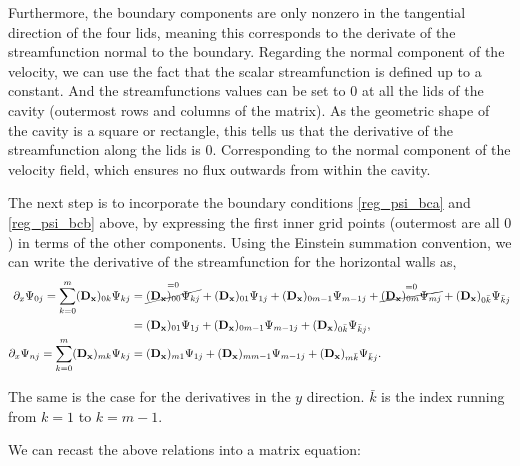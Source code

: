 Furthermore, the boundary components are only nonzero in the tangential
direction of the four lids, meaning this corresponds to the derivate of the
streamfunction normal to the boundary. Regarding the normal component of the
velocity, we can use the fact that the scalar streamfunction is defined up to a
constant. And the streamfunctions values can be set to $0$ at all the lids of
the cavity (outermost rows and columns of the matrix). As the geometric shape
of the cavity is a square or rectangle, this tells us that the derivative of
the streamfunction along the lids is $0$. Corresponding to the normal component
of the velocity field, which ensures no flux outwards from within the cavity.

The next step is to incorporate the boundary conditions \eqref{reg_psi_bca} and
\eqref{reg_psi_bcb} above, by expressing the first inner grid points (outermost
are all $0$) in terms of the other components. Using the Einstein summation
convention, we can write the derivative of the streamfunction for the
horizontal walls as,
\begin{align}
\partial_x \Psi_{0j} = \sum_{k=0}^{m} (\mathbf{D_x})_{0k} \Psi_{kj}
  &= \overset{=0}{\cancel{(\mathbf{D_x})_{00}\Psi_{kj}}} + (\mathbf{D_x})_{01}\Psi_{1j} 
  + (\mathbf{D_x})_{0m-1}\Psi_{m-1j} +  \overset{=0}{\cancel{(\mathbf{D_x})_{0m}\Psi_{mj}}}
  + (\mathbf{D_x})_{0\bar{k}}\Psi_{\bar{k}j} \nonumber \\
  &= (\mathbf{D_x})_{01}\Psi_{1j} + (\mathbf{D_x})_{0m-1}\Psi_{m-1j}
  + (\mathbf{D_x})_{0\bar{k}}\Psi_{\bar{k}j}, \\
\partial_x \Psi_{nj} = \sum_{k=0}^{m} (\mathbf{D_x})_{mk} \Psi_{kj}
  &= (\mathbf{D_x})_{m1}\Psi_{1j} + (\mathbf{D_x})_{mm-1}\Psi_{m-1j} 
  + (\mathbf{D_x})_{m\bar{k}}\Psi_{\bar{k}j}.
\end{align}

The same is the case for the derivatives in the $y$ direction. $\bar{k}$ is the
index running from $k=1$ to $k=m-1$.

We can recast the above relations into a matrix equation:

